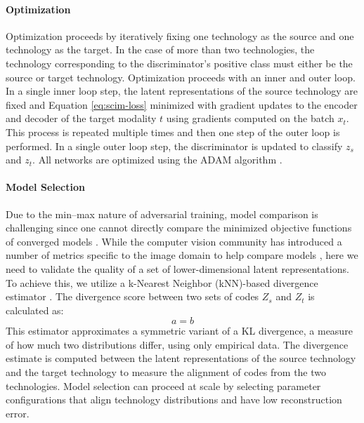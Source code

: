 \paragraph{Optimization}
Optimization proceeds by iteratively fixing one technology as the source and one technology as the target.
In the case of more than two technologies, the technology corresponding to the discriminator’s positive class must either be the source or target technology.
Optimization proceeds with an inner and outer loop.
In a single inner loop step, the latent representations of the source technology are fixed and Equation \ref{eq:scim-loss} minimized with gradient updates to the encoder and decoder of the target modality $t$ using gradients computed on the batch $x_t$.
This process is repeated multiple times and then one step of the outer loop is performed.
In a single outer loop step, the discriminator is updated to classify $z_s$ and $z_t$.
All networks are optimized using the ADAM algorithm \cite{Kingma2013}.


\paragraph{Model Selection}
Due to the min–max nature of adversarial training, model comparison is challenging since one cannot directly compare the minimized objective functions of converged models \cite{Lucic2017}.
While the computer vision community has introduced a number of metrics specific to the image domain to help compare models \cite{Heusel2017,Salimans2016}, here we need to validate the quality of a set of lower-dimensional latent representations.
To achieve this, we utilize a k-Nearest Neighbor (kNN)-based divergence estimator \cite{Wang2009}.
The divergence score between two sets of codes $Z_s$ and $Z_t$ is calculated as:
\begin{equation}
	a = b
\end{equation}
This estimator approximates a symmetric variant of a KL divergence, a measure of how much two distributions differ, using only empirical data.
The divergence estimate is computed between the latent representations of the source technology and the target technology to measure the alignment of codes from the two technologies.
Model selection can proceed at scale by selecting parameter configurations that align technology distributions and have low reconstruction error.


